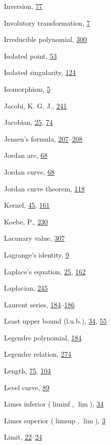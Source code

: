 \begin{theindex}
\item Inversion, \hyperlink{orig-p77}{77}
\item Involutory transformation, \hyperlink{orig-p7}{7}
\item Irreducible polynomial, \hyperlink{orig-p300}{300}
\item Isolated point, \hyperlink{orig-p53}{53}
\item Isolated singularity, \hyperlink{orig-p124}{124}
\item Isomorphism, \hyperlink{orig-p5}{5}
\item Jacobi, K. G. J., \hyperlink{orig-p241}{241}
\item Jacobian, \hyperlink{orig-p25}{25}, \hyperlink{orig-p74}{74}
\item Jensen's formula, \hyperlink{orig-p207}{207}--\hyperlink{orig-p208}{208}
\item Jordan arc, \hyperlink{orig-p68}{68}
\item Jordan curve, \hyperlink{orig-p68}{68}
\item Jordan curve theorem, \hyperlink{orig-p118}{118}
\item Kernel, \hyperlink{orig-p45}{45}, \hyperlink{orig-p161}{161}
\item Koebe, P., \hyperlink{orig-p230}{230}
\item Lacunary value, \hyperlink{orig-p307}{307}
\item Lagrange's identity, \hyperlink{orig-p9}{9}
\item Laplace's equation, \hyperlink{orig-p25}{25}, \hyperlink{orig-p162}{162}
\item Laplacian, \hyperlink{orig-p245}{245}
\item Laurent series, \hyperlink{orig-p184}{184}--\hyperlink{orig-p186}{186}
\item Least upper bound (l.u.b.), \hyperlink{orig-p34}{34}, \hyperlink{orig-p55}{55}
\item Legendre polynomial, \hyperlink{orig-p184}{184}
\item Legendre relation, \hyperlink{orig-p274}{274}
\item Length, \hyperlink{orig-p75}{75}, \hyperlink{orig-p104}{104}
\item Level curve, \hyperlink{orig-p89}{89}
\item Limes inferior ($\liminf$, $\underline{\lim}$), \hyperlink{orig-p34}{34}
\item Limes superior ($\limsup$, $\overline{\lim}$), \hyperlink{orig-p3}{3}
\item Limit, \hyperlink{orig-p22}{22}--\hyperlink{orig-p24}{24}

\end{theindex}
